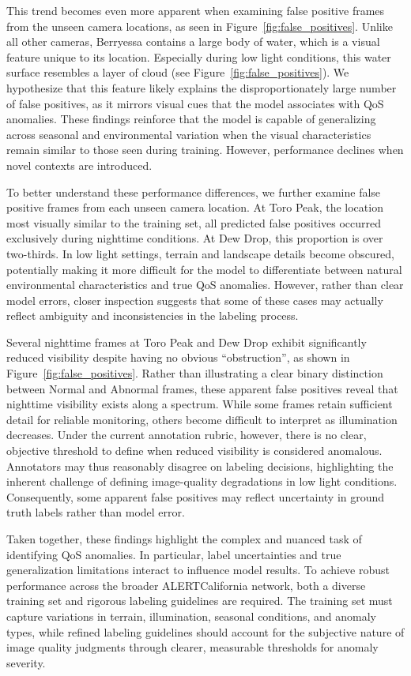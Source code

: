 \documentclass[remotesensing,article,submit,moreauthors]{Definitions/mdpi}
\begin{document}
This trend becomes even more apparent when examining false positive frames from the unseen camera locations, as seen in Figure~\ref{fig:false_positives}. Unlike all other cameras, Berryessa contains a large body of water, which is a visual feature unique to its location. Especially during low light conditions, this water surface resembles a layer of cloud (see Figure~\ref{fig:false_positives}). We hypothesize that this feature likely explains the disproportionately large number of false positives, as it mirrors visual cues that the model associates with \ac{QoS} anomalies. These findings reinforce that the model is capable of generalizing across seasonal and environmental variation when the visual characteristics remain similar to those seen during training. However, performance declines when novel contexts are introduced. 

To better understand these performance differences, we further examine false positive frames from each unseen camera location. At Toro Peak, the location most visually similar to the training set, all predicted false positives occurred exclusively during nighttime conditions. At Dew Drop, this proportion is over two-thirds. In low light settings, terrain and landscape details become obscured, potentially making it more difficult for the model to differentiate between natural environmental characteristics and true \ac{QoS} anomalies. However, rather than clear model errors, closer inspection suggests that some of these cases may actually reflect ambiguity and inconsistencies in the labeling process. 

Several nighttime frames at Toro Peak and Dew Drop exhibit significantly reduced visibility despite having no obvious ``obstruction”, as shown in Figure~\ref{fig:false_positives}. Rather than illustrating a clear binary distinction between Normal and Abnormal frames, these apparent false positives reveal that nighttime visibility exists along a spectrum. While some frames retain sufficient detail for reliable monitoring, others become difficult to interpret as illumination decreases. Under the current annotation rubric, however, there is no clear, objective threshold to define when reduced visibility is considered anomalous. Annotators may thus reasonably disagree on labeling decisions, highlighting the inherent challenge of defining image-quality degradations in low light conditions. Consequently, some apparent false positives may reflect uncertainty in ground truth labels rather than model error. 

Taken together, these findings highlight the complex and nuanced task of identifying \ac{QoS} anomalies. In particular, label uncertainties and true generalization limitations interact to influence model results. To achieve robust performance across the broader ALERTCalifornia network, both a diverse training set and rigorous labeling guidelines are required. The training set must capture variations in terrain, illumination, seasonal conditions, and anomaly types, while refined labeling guidelines should account for the subjective nature of image quality judgments through clearer, measurable thresholds for anomaly severity. 
\end{document}
